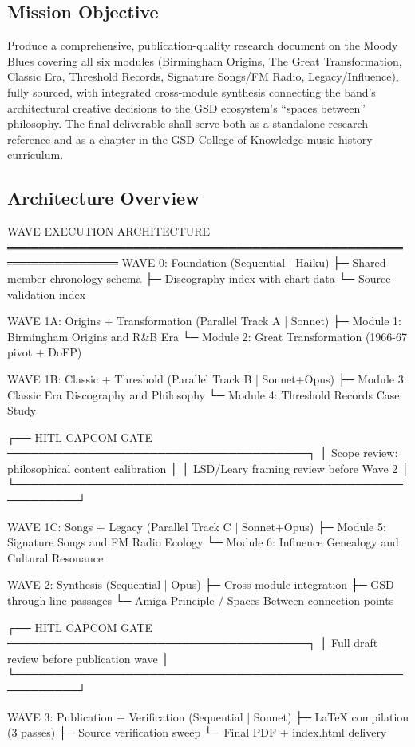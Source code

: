\documentclass[11pt,letterpaper]{article}
\begin{document}
\subsection{Mission Objective}

Produce a comprehensive, publication-quality research document on the Moody Blues covering all six modules (Birmingham Origins, The Great Transformation, Classic Era, Threshold Records, Signature Songs/FM Radio, Legacy/Influence), fully sourced, with integrated cross-module synthesis connecting the band's architectural creative decisions to the GSD ecosystem's ``spaces between'' philosophy. The final deliverable shall serve both as a standalone research reference and as a chapter in the GSD College of Knowledge music history curriculum.

\subsection{Architecture Overview}

\begin{asciibox}
 WAVE EXECUTION ARCHITECTURE
 ════════════════════════════════════════════════════════════════
  WAVE 0: Foundation (Sequential | Haiku)
  ├─ Shared member chronology schema
  ├─ Discography index with chart data
  └─ Source validation index

  WAVE 1A: Origins + Transformation (Parallel Track A | Sonnet)
  ├─ Module 1: Birmingham Origins and R&B Era
  └─ Module 2: Great Transformation (1966-67 pivot + DoFP)

  WAVE 1B: Classic + Threshold (Parallel Track B | Sonnet+Opus)
  ├─ Module 3: Classic Era Discography and Philosophy
  └─ Module 4: Threshold Records Case Study

  ┌── HITL CAPCOM GATE ──────────────────────────────────────┐
  │  Scope review: philosophical content calibration         │
  │  LSD/Leary framing review before Wave 2                  │
  └──────────────────────────────────────────────────────────┘

  WAVE 1C: Songs + Legacy (Parallel Track C | Sonnet+Opus)
  ├─ Module 5: Signature Songs and FM Radio Ecology
  └─ Module 6: Influence Genealogy and Cultural Resonance

  WAVE 2: Synthesis (Sequential | Opus)
  ├─ Cross-module integration
  ├─ GSD through-line passages
  └─ Amiga Principle / Spaces Between connection points

  ┌── HITL CAPCOM GATE ──────────────────────────────────────┐
  │  Full draft review before publication wave               │
  └──────────────────────────────────────────────────────────┘

  WAVE 3: Publication + Verification (Sequential | Sonnet)
  ├─ LaTeX compilation (3 passes)
  ├─ Source verification sweep
  └─ Final PDF + index.html delivery
\end{asciibox}
\end{document}
